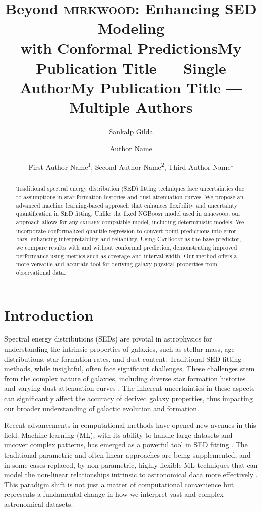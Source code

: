 \documentclass[letterpaper]{article} %
\title{Beyond \textsc{mirkwood}: Enhancing SED Modeling\\with Conformal Predictions}
\author{
Sankalp Gilda
}
\title{My Publication Title --- Single Author}
\author {
Author Name
}
\title{My Publication Title --- Multiple Authors}
\author {
First Author Name\textsuperscript{\rm 1},
Second Author Name\textsuperscript{\rm 2},
Third Author Name\textsuperscript{\rm 1}
}
\begin{document}
\maketitle

\begin{abstract}
Traditional spectral energy distribution (SED) fitting techniques face uncertainties due to assumptions in star formation histories and dust attenuation curves. We propose an advanced machine learning-based approach that enhances flexibility and uncertainty quantification in SED fitting. Unlike the fixed \textsc{NGBoost} model used in \textsc{mirkwood}, our approach allows for any \textsc{sklearn}-compatible model, including deterministic models. We incorporate conformalized quantile regression to convert point predictions into error bars, enhancing interpretability and reliability. Using \textsc{CatBoost} as the base predictor, we compare results with and without conformal prediction, demonstrating improved performance using metrics such as coverage and interval width. Our method offers a more versatile and accurate tool for deriving galaxy physical properties from observational data.
\end{abstract}




\section{Introduction}
Spectral energy distributions (SEDs) are pivotal in astrophysics for understanding the intrinsic properties of galaxies, such as stellar mass, age distributions, star formation rates, and dust content. Traditional SED fitting methods, while insightful, often face significant challenges. These challenges stem from the complex nature of galaxies, including diverse star formation histories and varying dust attenuation curves \cite{Gilda21, acquaviva2015simultaneous, simha2014parametrising}. The inherent uncertainties in these aspects can significantly affect the accuracy of derived galaxy properties, thus impacting our broader understanding of galactic evolution and formation.

Recent advancements in computational methods have opened new avenues in this field. Machine learning (ML), with its ability to handle large datasets and uncover complex patterns, has emerged as a powerful tool in SED fitting \cite{Gilda21, gilda_antoine, Chu2023galaxy}. The traditional parametric and often linear approaches are being supplemented, and in some cases replaced, by non-parametric, highly flexible ML techniques that can model the non-linear relationships intrinsic to astronomical data more effectively \cite{deepremap, deepremap_abstract_aas, cfht, neurips_cfht, feature_selection}. This paradigm shift is not just a matter of computational convenience but represents a fundamental change in how we interpret vast and complex astronomical datasets.
\end{document}
